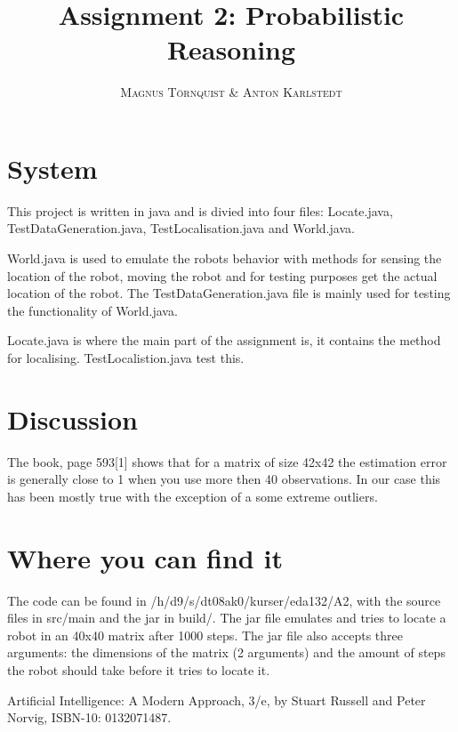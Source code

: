 \documentclass[twoside]{article}
\title{\vspace{-15mm}\fontsize{24pt}{10pt}\selectfont\textbf{Assignment 2: Probabilistic Reasoning}} %
\author{
\large
\textsc{
Magnus T\"{o}rnquist \&
Anton Karlstedt}\\[2mm] %
\vspace{-5mm}
}
\date{}
\begin{document}
\maketitle %

\thispagestyle{fancy} %

\section{System} %

This project is written in java and is divied into four files: Locate.java, TestDataGeneration.java, TestLocalisation.java and World.java. 

World.java is used to emulate the robots behavior with methods for sensing the location of the robot, moving the robot and for testing purposes get the actual location of the robot. 
The TestDataGeneration.java file is mainly used for testing the functionality of World.java.

Locate.java is where the main part of the assignment is, it contains the method for localising. TestLocalistion.java test this.

\section{Discussion}
The book, page 593[1] shows that for a matrix of size 42x42 the estimation error is generally close to 1 when you use more then 40 observations. In our case this has been mostly true with the exception 
of a some extreme outliers.

\section{Where you can find it}
The code can be found in /h/d9/s/dt08ak0/kurser/eda132/A2, with the source files in src/main and the jar in build/. The jar file emulates and tries to locate a robot in an 40x40 matrix 
after 1000 steps. The jar file also accepts three arguments: the dimensions of the matrix (2 arguments) and the amount of steps the robot should take before it tries to locate it.


\begin{thebibliography}{99} %
                            
  Artificial Intelligence: A Modern Approach, 3/e, by Stuart Russell and Peter Norvig, ISBN-10: 0132071487.

\end{thebibliography}

\end{document}
